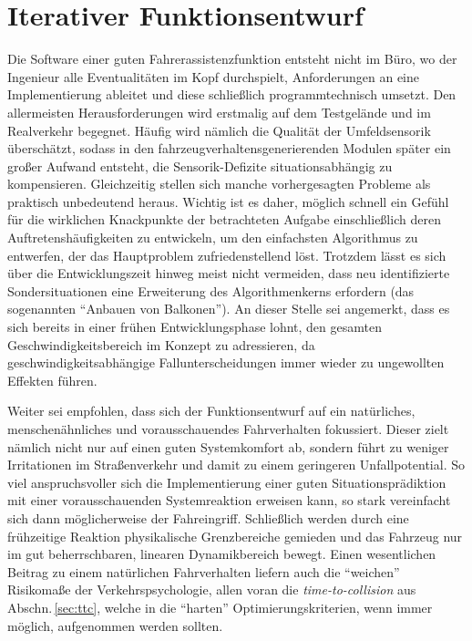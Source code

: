 \section{Iterativer Funktionsentwurf}
Die Software einer guten Fahrerassistenzfunktion entsteht nicht im Büro, wo der Ingenieur alle Eventualitäten im Kopf durchspielt, Anforderungen an eine Implementierung ableitet und diese schließlich programmtechnisch umsetzt. Den allermeisten Herausforderungen wird erstmalig auf dem Testgelände und im Realverkehr begegnet. Häufig wird nämlich die Qualität der Umfeldsensorik überschätzt, sodass in den fahrzeugverhaltensgenerierenden Modulen später ein großer Aufwand entsteht, die Sensorik-Defizite situationsabhängig zu kompensieren. Gleichzeitig stellen sich manche vorhergesagten Probleme als praktisch unbedeutend heraus. Wichtig ist es daher, möglich schnell ein Gefühl für die wirklichen Knackpunkte der betrachteten Aufgabe einschließlich deren Auftretenshäufigkeiten zu entwickeln, um den einfachsten Algorithmus zu entwerfen, der das Hauptproblem zufriedenstellend löst. Trotzdem lässt es sich über die Entwicklungszeit hinweg meist nicht vermeiden, dass neu identifizierte Sondersituationen eine Erweiterung des Algorithmenkerns erfordern (das sogenannten "`Anbauen von Balkonen"'). An dieser Stelle sei angemerkt, dass es sich bereits in einer frühen Entwicklungsphase lohnt, den gesamten Geschwindigkeitsbereich im Konzept zu adressieren, da geschwindigkeitsabhängige Fallunterscheidungen immer wieder zu ungewollten Effekten führen.

Weiter sei empfohlen, dass sich der Funktionsentwurf auf ein natürliches, menschenähnliches und vorausschauendes Fahrverhalten fokussiert. Dieser zielt nämlich nicht nur auf einen guten Systemkomfort ab, sondern führt zu weniger Irritationen im Straßenverkehr und damit zu einem geringeren Unfallpotential. So viel anspruchsvoller sich die Implementierung einer guten Situationsprädiktion mit einer vorausschauenden Systemreaktion erweisen kann, so stark vereinfacht sich dann möglicherweise der Fahreingriff. Schließlich werden durch eine frühzeitige Reaktion physikalische Grenzbereiche gemieden und das Fahrzeug nur im gut beherrschbaren, linearen Dynamikbereich bewegt. Einen wesentlichen Beitrag zu einem natürlichen Fahrverhalten liefern auch die "`weichen"' Risikomaße der Verkehrspsychologie, allen voran die \emph{time-to-collision} aus Abschn.\,\ref{sec:ttc}, welche in die "`harten"' Optimierungskriterien, wenn immer möglich, aufgenommen werden sollten.

